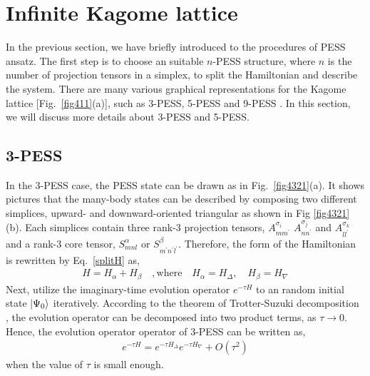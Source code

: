 \section{Infinite Kagome lattice}
\label{kagome}
In the previous section, we have briefly introduced to the procedures of PESS ansatz. The first step is to  choose an suitable $n$-PESS structure, where $n$ is the number of projection tensors in a simplex, to split the Hamiltonian and describe the system. There are many various graphical representations for the Kagome lattice [Fig.~\ref{fig411}(a)], such as 3-PESS, 5-PESS and 9-PESS \cite{PhysRevX.4.011025}. In this section, we will discuss more details about 3-PESS and 5-PESS.
\subsection{3-PESS}
In the 3-PESS case, the PESS state can be drawn as in Fig.~\ref{fig4321}(a). It shows pictures that the many-body states can be described by composing two different simplices, upward- and downward-oriented triangular as shown in Fig \ref{fig4321}(b). Each simplices contain three rank-3 projection tensors, $A^{\sigma_i}_{mm^{\prime}}$ $A^{\sigma_j}_{nn^{\prime}}$ and $A^{\sigma_k}_{ll^{\prime}}$ and a rank-3 core tensor, $S_{mnl}^{\alpha}$ or $S_{m^{\prime}n^{\prime}l^{\prime}}^{\beta}$. Therefore, the form of the Hamiltonian is rewritten by Eq.~\ref{splitH} as,
\begin{align}
	H = H_{\alpha} + H_{\beta} \quad,\text{where} \quad H_{\alpha} = H_{\Delta},\quad H_{\beta} = H_{\nabla}
\end{align}
Next, utilize the imaginary-time evolution operator $e^{-\tau H}$ to an random initial state $\Ket{\Psi_{0}}$ iteratively. According to the theorem of Trotter-Suzuki decomposition \cite{Suzuki01111976}, the evolution operator can be decomposed into two product terms, as $\tau \rightarrow 0$. Hence, the evolution operator operator of 3-PESS can be written as, 
\begin{align}
	\label{eq415}
	e^{-\tau H} = e^{-\tau H_{\Delta}} e^{-\tau H_{\nabla}} + O(\tau^2)
\end{align}
when the value of $\tau$ is small enough. 
\label{3pess}
